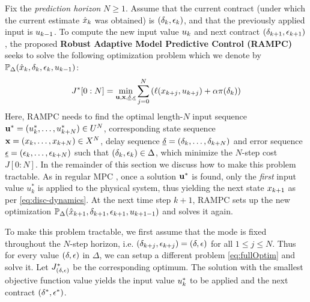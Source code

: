 Fix the \emph{prediction horizon} $N \geq 1$.
Assume that the current contract (under which the current estimate $\hat{x}_k$ was obtained) is $(\delta_{k},\epsilon_{k})$, and that the previously applied input is $u_{k-1}$.
To compute the new input value $u_{k}$ and next contract $(\delta_{k+1},\epsilon_{k+1})$, the proposed \textbf{Robust Adaptive Model Predictive Control (RAMPC)} seeks to solve the following optimization problem which we denote by $\mathbb{P}_{\Delta}(\hat{x}_{k},\delta_{k},\epsilon_{k},u_{k -1})$:
\begin{eqnarray}
\label{eq:fullOptim}
J^*[0:N]= \min_{\mathbf{u},\mathbf{x},\underline{\delta},\underline{\epsilon}}\sum_{j=0}^{N}\left(\ell(x_{k+j},u_{k+j})+\alpha\pi(\delta_k)\right)
\end{eqnarray}
Here, RAMPC needs to find the optimal length-$N$ input sequence  $\mathbf{u}^* = (u_k^*,\ldots,u_{k+N}^*) \in U^N$, corresponding state sequence $\mathbf{x} = (x_k,\ldots,x_{k+N}) \in X^N$, delay sequence $\underline{\delta} = (\delta_k,\ldots,\delta_{k+N})$ and error sequence $\underline{\epsilon} = (\epsilon_k,\ldots,\epsilon_{k+N})$ such that $(\delta_{k},\epsilon_{k}) \in \Delta$, which minimize the $N$-step cost $J[0:N]$.
In the remainder of this section we discuss how to make this problem tractable.
As in regular MPC \cite{camachoetal04mpc}, once a solution $\mathbf{u}^*$ is found, only the \emph{first} input value $u_k^*$ is applied to the physical system, thus yielding the next state $x_{k+1}$ as per \eqref{eq:disc-dynamics}.
At the next time step $k+1$, RAMPC sets up the new optimization $\mathbb{P}_{\Delta}(\hat{x}_{k+1},\delta_{k+1},\epsilon_{k+1},u_{k+1 -1})$ and solves it again.

To make this problem tractable, we first assume that the mode is fixed throughout the $N$-step horizon, i.e. $(\delta_{k+j},\epsilon_{k+j}) = (\delta,\epsilon)$ for all $1 \leq j \leq N$.
Thus for every value $(\delta,\epsilon)$ in $\Delta$, we can setup a different problem \eqref{eq:fullOptim} and solve it.
Let $J_{(\delta,\epsilon)}^*$ be the corresponding optimum.
The solution with the smallest objective function value yields the input value $u^*_k$ to be applied and the next contract $(\delta^*,\epsilon^*)$.

